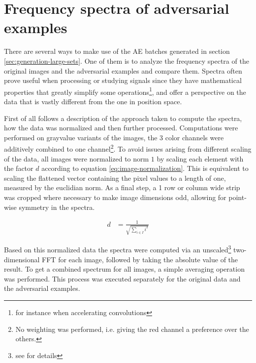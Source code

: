 \documentclass[11pt, a4paper]{article}
\begin{document}









\section{Frequency spectra of adversarial examples}
\label{sec:spectra}
There are several ways to make use of the AE batches generated in section \ref{sec:generation-large-sets}. One of them is to analyze the frequency spectra of the original images and the adversarial examples and compare them. Spectra often prove useful when processing or studying signals since they have mathematical properties that greatly simplify some operations\footnote{for instance when accelerating convolutions}, and offer a perspective on the data that is vastly different from the one in position space.

First of all follows a description of the approach taken to compute the spectra, how the data was normalized and then further processed. Computations were performed on grayvalue variants of the images, the 3 color channels were additively combined to one channel\footnote{No weighting was performed, i.e. giving the red channel a preference over the others.}. To avoid issues arising from different scaling of the data, all images were normalized to norm $1$ by scaling each element with the factor $d$ according to equation \eqref{eq:image-normalization}. This is equivalent to scaling the flattened vector containing the pixel values to a length of one, measured by the euclidian norm. As a final step, a 1 row or column wide strip was cropped where necessary to make image dimensions odd, allowing for point-wise symmetry in the spectra.

\begin{align}
	d &= \frac{1}{\displaystyle \sqrt{\sum_{i \in I}{i^2}}} \label{eq:image-normalization}
\end{align}

Based on this normalized data the spectra were computed via an unscaled\footnote{see \cite{numpy-fft} for details} two-dimensional FFT for each image, followed by taking the absolute value of the result. To get a combined spectrum for all images, a simple averaging operation was performed. This process was executed separately for the original data and the adversarial examples.
\end{document}
